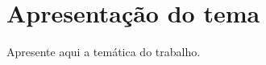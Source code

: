 \section{Apresentação do tema}
\label{sec:apresentacao-tema}


Apresente aqui a temática do trabalho.
